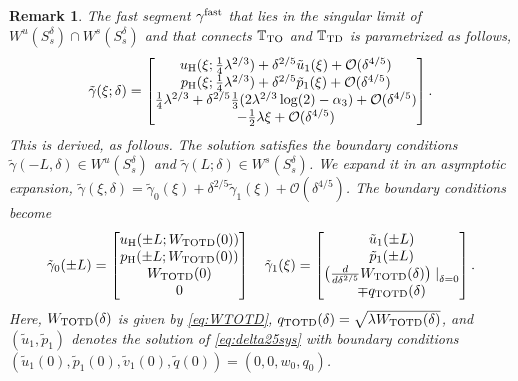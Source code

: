 \documentclass[11pt]{article}
\numberwithin{equation}{section}
\newtheorem{remark}{Remark}[section]
\begin{document}
\begin{remark}
    The fast segment $\gamma^{\rm fast}$ that lies in the singular limit of $W^u(S_s^\delta) \cap W^s(S_s^\delta)$ and that connects $\mathbb{T}_{\rm TO}$ and $\mathbb{T}_{\rm TD}$ is parametrized as follows,
    \begin{equation}\label{eq:gammafast}
    \tilde{\gamma}(\xi;\delta)
    = \begin{bmatrix}
          u_{\rm H} (\xi; \tfrac{1}{4} \lambda^{2/3}) + \delta^{2/5} \tilde{u}_1 (\xi)  + \mathcal{O}(\delta^{4/5}) \\
          p_{\rm H} (\xi; \tfrac{1}{4}\lambda^{2/3}) + \delta^{2/5} \tilde{p}_1 (\xi) + \mathcal{O}(\delta^{4/5}) \\
          \tfrac{1}{4}\lambda^{2/3} + \delta^{2/5}  \tfrac{1}{3}(2\lambda^{2/3} \log(2) - \alpha_3) + \mathcal{O}(\delta^{4/5}) \\
              - \tfrac{1}{2} \lambda \xi + \mathcal{O}(\delta^{4/5})
    \end{bmatrix}.
    \end{equation}
    This is derived, as follows.
    The solution satisfies the boundary conditions $\tilde{\gamma}(-L,\delta) \in W^u(S_s^\delta)$ and $\tilde{\gamma}(L;\delta) \in W^s(S_s^\delta)$.
    We expand it in an asymptotic expansion,
    $\tilde{\gamma}(\xi,\delta) = \tilde{\gamma}_0(\xi) + \delta^{2/5} \tilde{\gamma}_1(\xi) + \mathcal{O}(\delta^{4/5})$.
    The boundary conditions become
    \begin{equation*}
        \tilde{\gamma}_0 (\pm L) 
        = \begin{bmatrix}
              u_{\rm H} (\pm L; W_{\rm TOTD}(0)) \\
              p_{\rm H} (\pm L; W_{\rm TOTD}(0)) \\
              W_{\rm TOTD}(0) \\
              0
        \end{bmatrix}
        \quad
        \tilde{\gamma}_1(\xi) =
        \begin{bmatrix}
            \tilde{u}_1 (\pm L) \\
            \tilde{p}_1 (\pm L) \\
            \left( \tfrac{d}{d \delta^{2/5}} W_{\rm TOTD}(\delta) \right) \left. \right\vert_{\delta=0} \\
            \mp q_{\rm TOTD}(\delta)
        \end{bmatrix}.
    \end{equation*}
    Here, $W_{\rm TOTD}(\delta)$ is given by \eqref{eq:WTOTD},
    $q_{\rm TOTD}(\delta)=\sqrt{\lambda W_{\rm TOTD}(\delta)}$,
    and $(\tilde{u}_1,\tilde{p}_1)$ denotes the solution of
    \eqref{eq:delta25sys} with boundary conditions
    $(\tilde{u}_1(0), \tilde{p}_1(0), \tilde{v}_1(0), \tilde{q}(0))=(0,0,w_0,q_0)$.
\end{remark}
\end{document}

